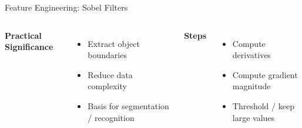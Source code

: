 \documentclass[
11pt,notheorems,hyperref={pdfauthor=whatever}
]{beamer}
\begin{document}
\begin{frame}{Feature Engineering: Sobel Filters}
\begin{columns}[T,onlytextwidth]
\vspace{2em}


    \alert<4>{\textbf{Practical Significance}}
    \begin{itemize}
    \item Extract object boundaries
    \item Reduce data complexity
    \item Basis for segmentation / recognition
    \end{itemize}
    
\vspace{1em}

\alert<5>{\textbf{Steps}}
\begin{itemize}
    \item {Compute derivatives}
    \item {Compute gradient magnitude}
    \item {Threshold / keep large values}
\end{itemize}



\end{columns}

\end{frame}




\end{document}
